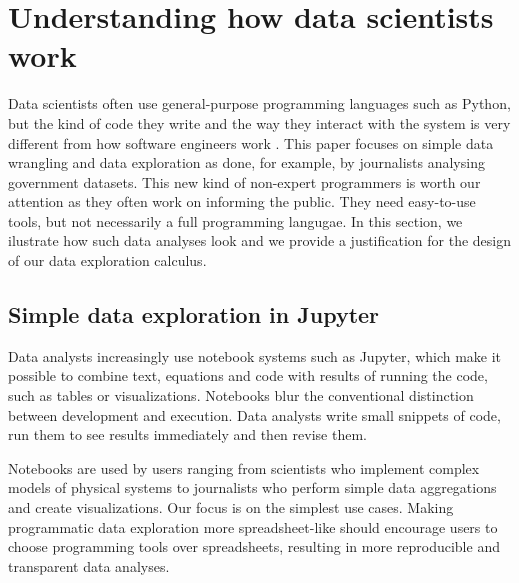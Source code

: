\documentclass[english,crc]{programming}
\theoremstyle{plain}
\theoremstyle{definition}
\begin{document}

\section{Understanding how data scientists work}
\label{sec:background}

Data scientists often use general-purpose programming languages such as Python, but the kind of
code they write and the way they interact with the system is very different from how software
engineers work \cite{workflow}. This paper focuses on simple data wrangling and data exploration as
done, for example, by journalists analysing government datasets. This new kind of non-expert
programmers is worth our attention as they often work on informing the public. They need easy-to-use
tools, but not necessarily a full programming langugae. In this section, we ilustrate how such
data analyses look and we provide a justification for the design of our data exploration calculus.


\subsection{Simple data exploration in Jupyter}
\label{sec:background-jupyter}

Data analysts increasingly use notebook systems such as Jupyter, which make it possible to
combine text, equations and code with results of running the code, such as tables or visualizations.
Notebooks blur the conventional distinction between development and execution. Data analysts write
small snippets of code, run them to see results immediately and then revise them.

Notebooks are used by users ranging from scientists who implement complex models of physical
systems to journalists who perform simple data aggregations and create visualizations. Our
focus is on the simplest use cases. Making programmatic data exploration more
spreadsheet-like should encourage users to choose programming tools over spreadsheets, resulting
in more reproducible and transparent data analyses.
\end{document}
